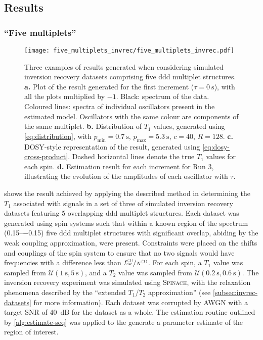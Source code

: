 \subsection{Results}
\label{subsec:seq-results}
\subsubsection{``Five multiplets''}
\begin{figure}
    \texttt{[image: five\_multiplets\_invrec/five\_multiplets\_invrec.pdf]}
    \caption[
        Three examples of results generated wehn considering simulated
        inversion recovery datasets comprising five ddd multiplet structures.
    ]
    {
        Three examples of results generated when considering
        simulated inversion recovery datasets comprising five ddd multiplet
        structures.
        \textbf{a.} Plot of the result generated for the first increment ($\tau
        = \qty{0}{\second}$), with all the plots multiplied by $-1$. Black:
        spectrum of the data. Coloured lines: spectra of individual oscillators
        present in the estimated model. Oscillators with the same colour
        are components of the same multiplet.
        \textbf{b.} Distribution of $T_1$ values, generated using
        \cref{eq:distribution}, with
        $p_{\text{min}} = \qty{0.7}{\second}$,
        $p_{\text{max}} = \qty{5.3}{\second}$,
        $c = 40$,
        $R=128$.
        \textbf{c.} \ac{DOSY}-style representation of the result, generated using
        \cref{eq:dosy-cross-product}.
        Dashed horizontal lines denote the true $T_1$ values for each spin.
        \textbf{d.} Estimation result for each increment for Run 3,
        illustrating the evolution of the amplitudes of each oscillator with
        $\tau$.
    }
    \label{fig:five-multiplets-invrec}
\end{figure}
 shows the result achieved by applying the
described method in determining the $T_1$ associated with signals in a set of
three of simulated inversion recovery datasets featuring 5 overlapping ddd
multiplet structures.
Each dataset was generated using spin systems such that within a
known region of the spectrum (\SIrange{0.15}{-0.15}{\partspermillion}) five ddd
multiplet structures with significant overlap, abiding by the weak coupling
approximation, were present.
Constraints were placed on the shifts and
couplings of the spin system to ensure that no two signals would have
frequencies with a difference less than $\nicefrac{\fswone}{\None}$.
For each spin, a $T_1$ value was sampled from $\mathcal{U}(\qty{1}{\second},
\qty{5}{\second})$, and a $T_2$ value was sampled from
$\mathcal{U}(\qty{0.2}{\second}, \qty{0.6}{\second})$.
The inversion recovery experiment was simulated using \textsc{Spinach}, with the
relaxation phenomena described by the ``extended $T_1$/$T_2$
approximation'' (see \cref{subsec:invrec-datasets} for more information).
Each dataset was corrupted by \ac{AWGN} with a target \ac{SNR} of
\qty{40}{\deci\bel} for the dataset as a whole.
The estimation routine outlined by \cref{alg:estimate-seq} was applied
to the generate a parameter estimate of the region of interest.

